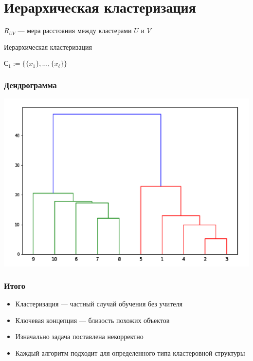 \documentclass{beamer}
\begin{document}
	\section{Иерархическая кластеризация}

	\begin{frame}

		$R_{UV}$ --- мера расстояния между кластерами $U$ и $V$

		\begin{algorithm}[H]
			\caption{Иерархическая кластеризация}

			$С_1 := \{\{x_1\}, \dots, \{x_{\ell}\}\}$
			
		\end{algorithm}	
	\end{frame}

	\begin{frame}
		\frametitle{Дендрограмма}

		\includegraphics[width=1\textwidth]{img/ierarh.png}
	\end{frame}

	\begin{frame}
		\frametitle{Итого}

		\begin{itemize}
			\item Кластеризация --- частный случай обучения без учителя
			\item Ключевая концепция --- близость похожих объектов 
			\item Изначально задача поставлена некорректно
			\item Каждый алгоритм подходит для определенного типа кластеровной структуры
		\end{itemize}
	\end{frame}
\end{document}
